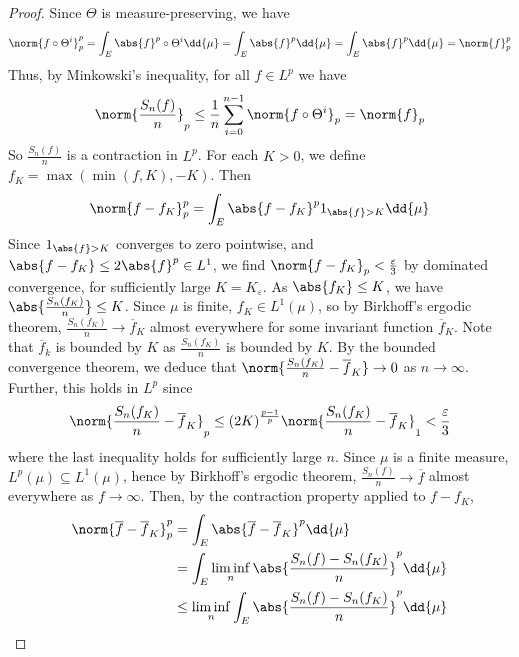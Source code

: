 \begin{proof}
	Since $\Theta$ is measure-preserving, we have
	\begin{align*}
        \norm{f \circ \Theta^i}_p^p = \int_E \abs{f}^p \circ \Theta^i \dd{\mu} = \int_E \abs{f}^p \dd{\mu} = \int_E \abs{f}^p \dd{\mu} = \norm{f}_p^p
    \end{align*}
	Thus, by Minkowski's inequality, for all $f \in L^p$ we have
	\begin{align*}
        \norm{\frac{S_n(f)}{n}}_p \leq \frac{1}{n} \sum_{i=0}^{n-1} \norm{f \circ \Theta^i}_p = \norm{f}_p
    \end{align*}
	So $\frac{S_n(f)}{n}$ is a contraction in $L^p$.
	For each $K > 0$, we define $f_K = \max(\min(f, K), -K)$.
	Then
	\begin{align*}
        \norm{f - f_K}_p^p = \int_E \abs{f - f_K}^p 1_{\abs{f} > K} \dd{\mu}
    \end{align*}
	Since $1_{\abs{f} > K}$ converges to zero pointwise, and $\abs{f - f_K} \leq 2\abs{f}^p \in L^1$, we find $\norm{f - f_K}_p < \frac{\varepsilon}{3}$ by dominated convergence, for sufficiently large $K = K_\varepsilon$.
	As $\abs{f_K} \leq K$, we have $\abs{\frac{S_n(f_K)}{n}} \leq K$.
	Since $\mu$ is finite, $f_K \in L^1(\mu)$, so by Birkhoff's ergodic theorem, $\frac{S_n(f_K)}{n} \to \overline f_K$ almost everywhere for some invariant function $\overline f_K$.
	Note that $\overline f_k$ is bounded by $K$ as $\frac{S_n(f_K)}{n}$ is bounded by $K$.
	By the bounded convergence theorem, we deduce that $\norm{\frac{S_n(f_K)}{n} - \overline f_K} \to 0$ as $n \to \infty$.
	Further, this holds in $L^p$ since
	\begin{align*}
        \norm{\frac{S_n(f_K)}{n} - \overline f_K}_p \leq (2K)^{\frac{p-1}{p}} \norm{\frac{S_n(f_K)}{n} - \overline f_K}_1 < \frac{\varepsilon}{3}
    \end{align*}
	where the last inequality holds for sufficiently large $n$.
	Since $\mu$ is a finite measure, $L^p(\mu) \subseteq L^1(\mu)$, hence by Birkhoff's ergodic theorem, $\frac{S_n(f)}{n} \to \overline f$ almost everywhere as $f \to \infty$.
	Then, by the contraction property applied to $f - f_K$,
	\begin{align*}
		\norm{\overline f - \overline f_K}_p^p &= \int_E \abs{\overline f - \overline f_K}^p \dd{\mu} \\
		&= \int_E \liminf_n \abs{\frac{S_n(f) - S_n(f_K)}{n}}^p \dd{\mu} \\
		&\leq \liminf_n \int_E \abs{\frac{S_n(f) - S_n(f_K)}{n}}^p \dd{\mu} \\

\end{align*}
\end{proof}

